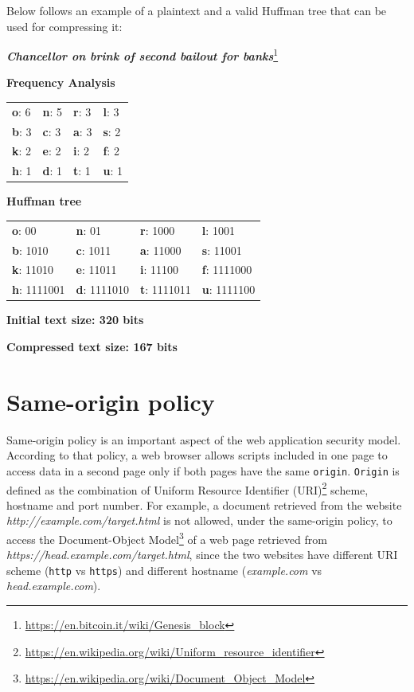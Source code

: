 Below follows an example of a plaintext and a valid Huffman tree that can be
used for compressing it:

\bigskip \centerline{\textit{\textbf{Chancellor on brink of second bailout for
banks}}\footnote{\url{https://en.bitcoin.it/wiki/Genesis_block}}}

\bigskip \centerline{\textbf{Frequency Analysis}}

\begin{table}[H] \centering \begin{tabular}{ | l | l | l | l | } \hline
\textbf{o}: 6 & \textbf{n}: 5 & \textbf{r}: 3 & \textbf{l}: 3 \\ \textbf{b}: 3 &
\textbf{c}: 3 & \textbf{a}: 3 & \textbf{s}: 2 \\ \textbf{k}: 2 & \textbf{e}: 2 &
\textbf{i}: 2 & \textbf{f}: 2 \\ \textbf{h}: 1 & \textbf{d}: 1 & \textbf{t}: 1 &
\textbf{u}: 1 \\ \hline \end{tabular} \end{table}

\centerline{\textbf{Huffman tree}}

\begin{table}[H] \centering \begin{tabular}{ | l | l | l | l | } \hline
\textbf{o}: 00 & \textbf{n}: 01 & \textbf{r}: 1000 & \textbf{l}: 1001 \\
\textbf{b}: 1010 & \textbf{c}: 1011 & \textbf{a}: 11000 & \textbf{s}: 11001 \\
\textbf{k}: 11010 & \textbf{e}: 11011 & \textbf{i}: 11100 & \textbf{f}: 1111000
\\ \textbf{h}: 1111001 & \textbf{d}: 1111010 & \textbf{t}: 1111011 & \textbf{u}:
1111100 \\ \hline \end{tabular} \end{table}

\centerline{\textbf{Initial text size: 320 bits}} \centerline{\textbf{Compressed
text size: 167 bits}}

\section{Same-origin policy}\label{sec:sameorigin}

Same-origin policy is an important aspect of the web application security model.
According to that policy, a web browser allows scripts included in one page to
access data in a second page only if both pages have the same \texttt{origin}.
\texttt{Origin} is defined as the combination of Uniform Resource Identifier
(URI)\footnote{\url{https://en.wikipedia.org/wiki/Uniform_resource_identifier}}
scheme, hostname and port number. For example, a document retrieved from the
website \textit{http://example.com/target.html} is not allowed, under the
same-origin policy, to access the Document-Object
Model\footnote{\url{https://en.wikipedia.org/wiki/Document_Object_Model}} of a
web page retrieved from \textit{https://head.example.com/target.html}, since the
two websites have different URI scheme (\texttt{http} vs \texttt{https}) and
different hostname (\textit{example.com} vs \textit{head.example.com}).

